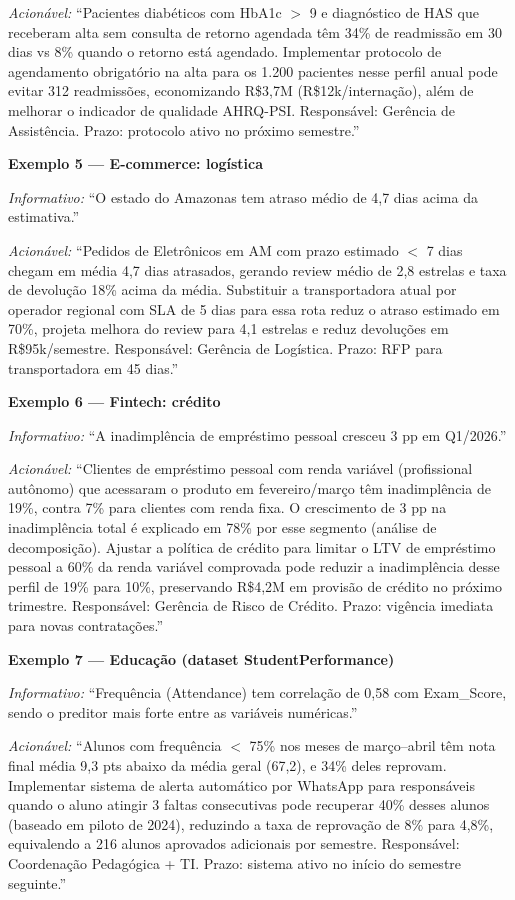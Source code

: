 \textit{Acionável:} ``Pacientes diabéticos com HbA1c $>$ 9 e diagnóstico de HAS que receberam alta sem consulta de retorno agendada têm 34\% de readmissão em 30 dias vs 8\% quando o retorno está agendado. Implementar protocolo de agendamento obrigatório na alta para os 1.200 pacientes nesse perfil anual pode evitar 312 readmissões, economizando R\$3,7M (R\$12k/internação), além de melhorar o indicador de qualidade AHRQ-PSI. Responsável: Gerência de Assistência. Prazo: protocolo ativo no próximo semestre.''

\medskip
\textbf{Exemplo 5 --- E-commerce: logística}

\textit{Informativo:} ``O estado do Amazonas tem atraso médio de 4,7 dias acima da estimativa.''

\textit{Acionável:} ``Pedidos de Eletrônicos em AM com prazo estimado $<$ 7 dias chegam em média 4,7 dias atrasados, gerando review médio de 2,8 estrelas e taxa de devolução 18\% acima da média. Substituir a transportadora atual por operador regional com SLA de 5 dias para essa rota reduz o atraso estimado em 70\%, projeta melhora do review para 4,1 estrelas e reduz devoluções em R\$95k/semestre. Responsável: Gerência de Logística. Prazo: RFP para transportadora em 45 dias.''

\medskip
\textbf{Exemplo 6 --- Fintech: crédito}

\textit{Informativo:} ``A inadimplência de empréstimo pessoal cresceu 3 pp em Q1/2026.''

\textit{Acionável:} ``Clientes de empréstimo pessoal com renda variável (profissional autônomo) que acessaram o produto em fevereiro/março têm inadimplência de 19\%, contra 7\% para clientes com renda fixa. O crescimento de 3 pp na inadimplência total é explicado em 78\% por esse segmento (análise de decomposição). Ajustar a política de crédito para limitar o LTV de empréstimo pessoal a 60\% da renda variável comprovada pode reduzir a inadimplência desse perfil de 19\% para 10\%, preservando R\$4,2M em provisão de crédito no próximo trimestre. Responsável: Gerência de Risco de Crédito. Prazo: vigência imediata para novas contratações.''

\medskip
\textbf{Exemplo 7 --- Educação (dataset StudentPerformance)}

\textit{Informativo:} ``Frequência (Attendance) tem correlação de 0,58 com Exam\_Score, sendo o preditor mais forte entre as variáveis numéricas.''

\textit{Acionável:} ``Alunos com frequência $<$ 75\% nos meses de março--abril têm nota final média 9,3 pts abaixo da média geral (67,2), e 34\% deles reprovam. Implementar sistema de alerta automático por WhatsApp para responsáveis quando o aluno atingir 3 faltas consecutivas pode recuperar 40\% desses alunos (baseado em piloto de 2024), reduzindo a taxa de reprovação de 8\% para 4,8\%, equivalendo a 216 alunos aprovados adicionais por semestre. Responsável: Coordenação Pedagógica + TI. Prazo: sistema ativo no início do semestre seguinte.''

